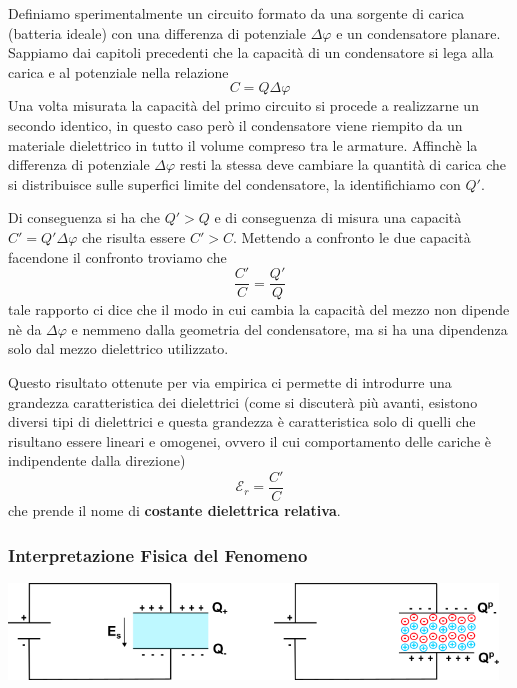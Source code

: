 Definiamo sperimentalmente un circuito formato da una sorgente di carica (batteria ideale) con una differenza di potenziale $\Delta \varphi$ e un condensatore planare. Sappiamo dai capitoli precedenti che la capacit\`a di un condensatore si lega alla carica e al potenziale nella relazione 
\begin{equation*}
	C = Q \Delta\varphi
\end{equation*}
Una volta misurata la capacit\`a del primo circuito si procede a realizzarne un secondo identico, in questo caso per\`o il condensatore viene riempito da un materiale dielettrico in tutto il volume compreso tra le armature. Affinch\`e la differenza di potenziale $\Delta \varphi$ resti la stessa deve cambiare la quantit\`a di carica che si distribuisce sulle superfici limite del condensatore, la identifichiamo con $Q'$.  

Di conseguenza si ha che $Q' > Q$ e di conseguenza di misura una capacit\`a $C' = Q' \Delta \varphi$ che risulta essere $C' > C$. Mettendo a confronto le due capacit\`a facendone il confronto troviamo che 
\begin{equation*}
	\frac{C'}{C} = \frac{Q'}{Q}
\end{equation*}
tale rapporto ci dice che il modo in cui cambia la capacit\`a del mezzo non dipende n\`e da $\Delta \varphi$ e nemmeno dalla geometria del condensatore, ma si ha una dipendenza solo dal mezzo dielettrico utilizzato.

Questo risultato ottenute per via empirica ci permette di introdurre una grandezza caratteristica dei dielettrici (come si discuter\`a pi\`u avanti, esistono diversi tipi di dielettrici e questa grandezza \`e caratteristica solo di quelli che risultano essere lineari e omogenei, ovvero il cui comportamento delle cariche \`e indipendente dalla direzione)
\begin{equation}
	\mathcal{E}_{r} = \frac{C'}{C}
\end{equation}
che prende il nome di \textbf{costante dielettrica relativa}.

\subsubsection{Interpretazione Fisica del Fenomeno}
\vspace{0.5cm}
\begin{center}
	\includegraphics[width = 13cm]{images/faraday_exp1}
\end{center}

